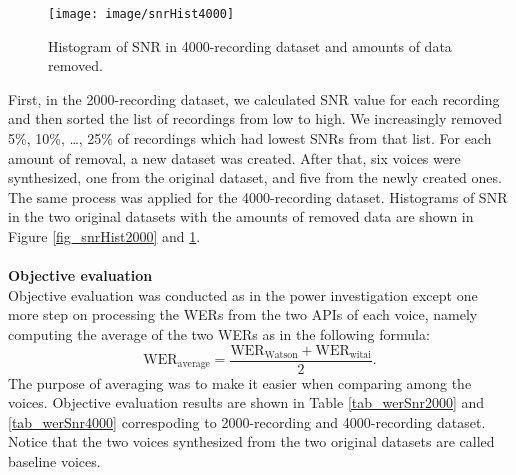 \documentclass[12pt]{article}
\begin{document}
\begin{figure}[t]
\begin{center}
\texttt{[image: image/snrHist4000]}
\end{center}
\vspace{-0.3cm}
\caption[Histogram of SNR in 4000-recording dataset and amounts of data removed.]{Histogram of SNR in 4000-recording dataset and amounts of data removed.}
\label{fig_snrHist4000}
\end{figure}

First, in the 2000-recording dataset, we calculated SNR value for each recording and then sorted the list of recordings from low to high. We increasingly removed 5\%, 10\%, …, 25\% of recordings which had lowest SNRs from that list. For each amount of removal, a new dataset was created. After that, six voices were synthesized, one from the original dataset, and five from the newly created ones. The same process was applied for the 4000-recording dataset. Histograms of SNR in the two original datasets with the amounts of removed data are shown in Figure \ref{fig_snrHist2000} and \ref{fig_snrHist4000}.\\\\
\textbf{Objective evaluation}
\vspace{0.28cm}\\
Objective evaluation was conducted as in the power investigation except one more step on processing the WERs from the two APIs of each voice, namely computing the average of the two WERs as in the following formula:
\begin{equation}\label{exp_averageWer}
    \text{WER}_{\text{average}} = \frac{\text{WER}_{\text{Watson}} + \text{WER}_{\text{witai}}}{2}.
\end{equation}
The purpose of averaging was to make it easier when comparing among the voices. Objective evaluation results are shown in Table \ref{tab_werSnr2000} and \ref{tab_werSnr4000} correspoding to 2000-recording and 4000-recording dataset. Notice that the two voices synthesized from the two original datasets are called baseline voices.
\end{document}
